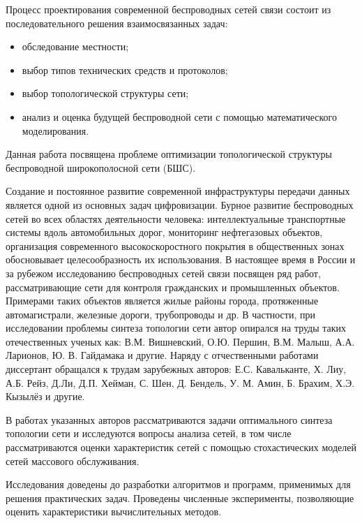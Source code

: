 Процесс проектирования современной  беспроводных сетей связи состоит из последовательного решения взаимосвязанных задач:

\begin{itemize}
    \item обследование местности;
    \item выбор типов технических средств и протоколов;
    \item выбор топологической структуры сети;
    \item анализ и оценка будущей беспроводной сети с помощью математического моделирования.
\end{itemize}

Данная работа посвящена проблеме оптимизации топологической структуры беспроводной широкополосной сети (БШС).


{\progress} Создание и постоянное развитие современной инфраструктуры передачи данных является одной из основных задач цифровизации. Бурное развитие беспроводных сетей во всех областях деятельности человека: интеллектуальные транспортные системы вдоль автомобильных дорог, мониторинг нефтегазовых объектов, организация современного высокоскоростного покрытия в общественных зонах обосновывает целесообразность их использования. В настоящее время в России и за рубежом исследованию беспроводных сетей связи посвящен ряд работ, рассматривающие сети для контроля гражданских  и промышленных объектов. Примерами таких объектов является жилые районы города, протяженные автомагистрали, железные дороги, трубопроводы и др. В частности, при исследовании проблемы синтеза топологии сети автор опирался на труды таких отечественных ученых как: В.М. Вишневский, О.Ю. Першин, В.М. Малыш,  А.А. Ларионов, Ю. В. Гайдамака и другие.
Наряду с отчественными работами диссертант обращался к трудам зарубежных авторов: Е.С. Кавальканте, Х. Лиу, А.Б. Рейз, Д.Ли, Д.П. Хейман, С. Шен, Д. Бендель, У. М. Амин, Б. Брахим, Х.Э. Кызылёз и другие. 

В работах указанных авторов рассматриваются задачи оптимального синтеза топологии сети и исследуются вопросы анализа сетей, в том числе рассматриваются оценки характеристик сетей с помощью стохастических моделей сетей массового обслуживания. 


Исследования доведены до разработки алгоритмов и программ, применимых для решения практических задач. Проведены численные эксперименты, позволяющие оценить характеристики вычислительных методов.


